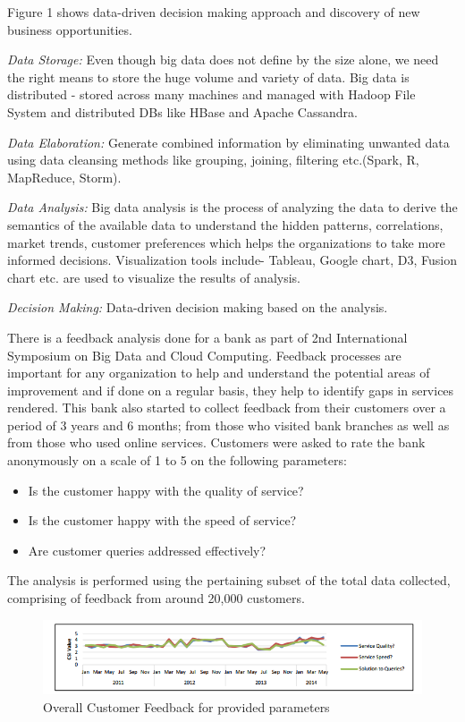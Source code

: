 \documentclass[sigconf]{acmart}
\begin{document}
Figure 1  shows data-driven decision making approach and discovery of new business opportunities.

\textit{Data Storage:} Even though big data does not define by the size alone, we need the right means to store the huge volume and variety of data. Big data is distributed - stored across many machines and managed with Hadoop File System and distributed DBs like HBase and Apache Cassandra\cite{big-data-storage}.

\textit{Data Elaboration:} Generate combined information by eliminating unwanted data using data cleansing methods like grouping, joining, filtering etc.(Spark, R, MapReduce, Storm). 

\textit{Data Analysis:} Big data analysis is the process of analyzing the data to derive the semantics of the available data to understand the hidden patterns, correlations, market trends, customer preferences which helps the organizations to take more informed decisions. Visualization tools include- Tableau, Google chart, D3, Fusion chart etc. are used to visualize the results of analysis.

\textit{Decision Making:} Data-driven decision making based on the analysis.
 
 There is a feedback analysis done for a bank as part of 2nd International Symposium on Big Data and Cloud Computing. Feedback processes are important for any organization to help and understand the potential areas of improvement and if done on a regular basis, they help to identify gaps in services rendered. This bank also started to collect feedback from their customers over a period of 3 years and 6 months; from those who visited bank branches as well as from those who used online services. Customers were asked to rate the bank anonymously on a scale of 1 to 5 on the following parameters: 
 
\begin{itemize}
   \item Is the customer happy with the quality of service?
   \item Is the customer happy with the speed of service?
   \item Are customer queries addressed effectively?
\end{itemize}

The analysis is performed using the pertaining subset of the total data collected, comprising of feedback from around 20,000 customers\cite{bigdata-banking}. 

\begin{figure}[htb]
  \centering
  \includegraphics[width=1.0\textwidth]{images/Figure2.png}
  \caption{Overall Customer Feedback for provided parameters 
  \cite{bigdata-banking}}
  \label{fig:Figure2} 
\end{figure}
\end{document}
